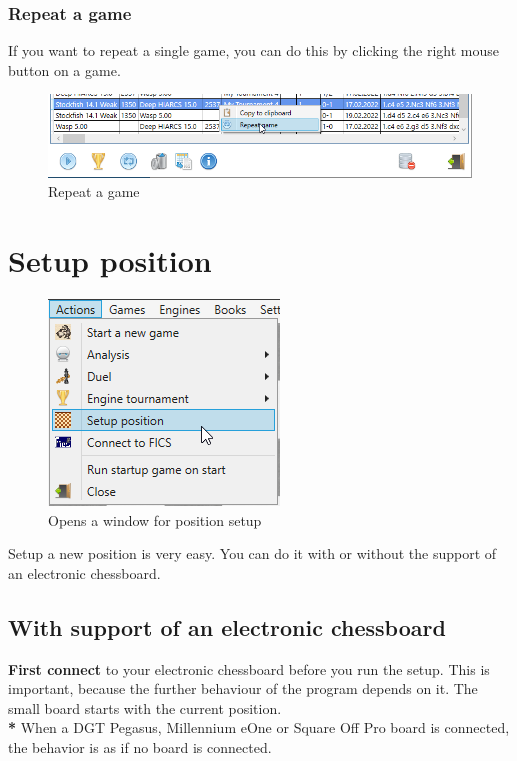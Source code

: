 \documentclass[11pt,a4paper]{article}
\begin{document}
\subsubsection{Repeat a game}
If you want to repeat a single game, you can do this by clicking the right mouse button on a game.

\begin{figure}[H]
	\centering
	\includegraphics[scale=0.6]{EngineTournament8.png}
	\caption{Repeat a game}
	\label{fig:EngineTournament8}
\end{figure}


\section{Setup position} \label{SetupPosition}

\begin{figure}[H]
	\centering
	\includegraphics[scale=1.0]{SetupPosition1.png}
	\caption{Opens a window for position setup}
	\label{fig:SetupPosition1}
\end{figure}

Setup a new position is very easy. You can do it with or without the support of an electronic chessboard.

\subsection{With support of an electronic chessboard}

\textbf{First connect} to your electronic chessboard before you run the setup. This is important, because the further behaviour of the program depends on it.
The small board starts with the current position.\\
\textbf{{\color{red}*}} When a DGT Pegasus, Millennium eOne or Square Off Pro board is connected, the behavior is as if no board is connected.
\end{document}
